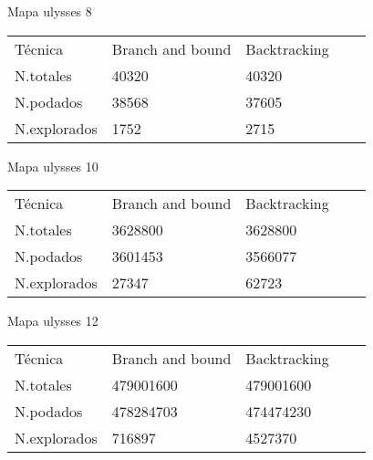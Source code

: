 	
	



		\begin{table}[H]
			Mapa ulysses 8
			\centering
			
			\label{my-label}
			\begin{tabular}{lllll}
				Técnica	& Branch and bound & Backtracking  &   \\
				N.totales& 40320&40320  &  &  \\
				N.podados&  38568& 37605 &  &  \\
				N.explorados&1752  &2715 &  &  \\
				
			\end{tabular}
		\end{table}
		

	
	


 
		\begin{table}[H]
							Mapa ulysses 10
			\centering
			
			\label{my-label}
			\begin{tabular}{lllll}
				Técnica	& Branch and bound & Backtracking  &   \\
				N.totales& 3628800&3628800  &  &  \\
				N.podados&  3601453& 3566077 &  &  \\
				N.explorados&27347  &62723  &  &  \\
				
			\end{tabular}
		\end{table}
		

	
	

	
						
		\begin{table}[H]
			Mapa ulysses 12
			\centering
			
			\label{my-label}
			\begin{tabular}{lllll}
				Técnica	& Branch and bound & Backtracking  &   \\
				N.totales& 479001600&479001600 &  &  \\
				N.podados&  478284703& 474474230&  &  \\
				N.explorados&716897  &4527370  &  &  \\
				
			\end{tabular}
		\end{table}
		

	


